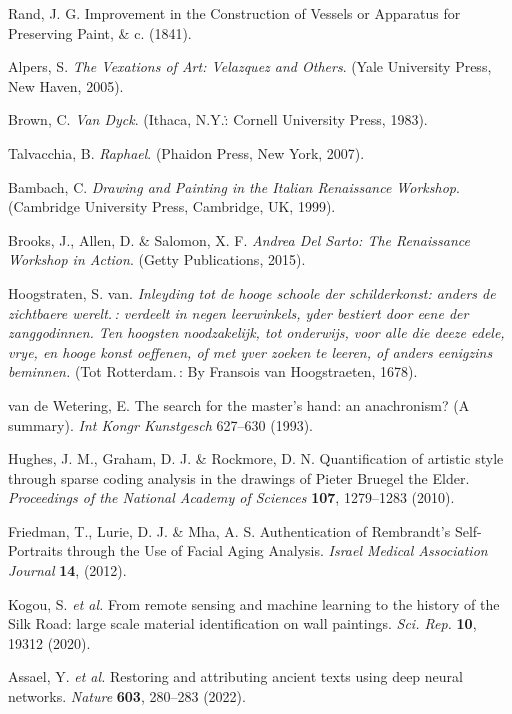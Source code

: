 \documentclass[11pt]{article}
\begin{document}
\begin{thebibliography}{42}

Rand, J. G. Improvement in the Construction of Vessels or Apparatus
for Preserving Paint, \& c. (1841).

Alpers, S. \emph{The Vexations of Art: Velazquez and Others}. (Yale
University Press, New Haven, 2005).

Brown, C. \emph{Van Dyck}. (Ithaca, N.Y.\.: Cornell University Press,
1983).

Talvacchia, B. \emph{Raphael}. (Phaidon Press, New York, 2007).

Bambach, C. \emph{Drawing and Painting in the Italian Renaissance
Workshop}. (Cambridge University Press, Cambridge, UK, 1999).

Brooks, J., Allen, D. \& Salomon, X. F. \emph{Andrea Del Sarto: The
Renaissance Workshop in Action}. (Getty Publications, 2015).

Hoogstraten, S. van. \emph{Inleyding tot de hooge schoole der
schilderkonst: anders de zichtbaere werelt.\,: verdeelt in negen
leerwinkels, yder bestiert door eene der zanggodinnen. Ten hoogsten
noodzakelijk, tot onderwijs, voor alle die deeze edele, vrye, en hooge
konst oeffenen, of met yver zoeken te leeren, of anders eenigzins
beminnen.} (Tot Rotterdam.\,: By Fransois van Hoogstraeten, 1678).

van de Wetering, E. The search for the master's hand: an anachronism?
(A summary). \emph{Int Kongr Kunstgesch} 627--630 (1993).

Hughes, J. M., Graham, D. J. \& Rockmore, D. N. Quantification of
artistic style through sparse coding analysis in the drawings of Pieter
Bruegel the Elder. \emph{Proceedings of the National Academy of
Sciences} \textbf{107}, 1279--1283 (2010).

Friedman, T., Lurie, D. J. \& Mha, A. S. Authentication of
Rembrandt's Self-Portraits through the Use of Facial Aging Analysis.
\emph{Israel Medical Association Journal} \textbf{14}, (2012).

Kogou, S. \emph{et al.} From remote sensing and machine learning to
the history of the Silk Road: large scale material identification on
wall paintings. \emph{Sci. Rep.} \textbf{10}, 19312 (2020).

Assael, Y. \emph{et al.} Restoring and attributing ancient texts
using deep neural networks. \emph{Nature} \textbf{603}, 280--283 (2022).


\end{thebibliography}
\end{document}
